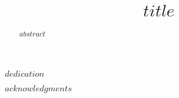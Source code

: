 \documentclass[ms]{uncgdissertationexp}
\title{$title$}
\theoremstyle{plain}
\theoremstyle{definition}
\theoremstyle{remark}
\begin{document}
\frontmatter      %

\begin{abstract}
  $abstract$
\end{abstract}

\maketitlepage


\begin{dedication}
  $dedication$
\end{dedication}

\makeapprovalpage

\begin{acknowledgments}
  $acknowledgments$
\end{acknowledgments}

\end{document}
